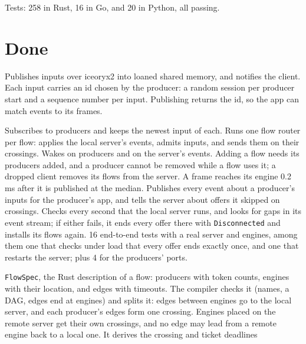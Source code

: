 \documentclass[11pt]{article}
\newcommand{\code}[1]{\texttt{#1}}
\begin{document}
Tests: 258 in Rust, 16 in Go, and 20 in Python, all passing.

\section{Done}

\begin{description}[style=nextline, leftmargin=1.5em]
  \item[Producer (\code{producer.rs}, \code{envelope.rs})] Publishes inputs
        over iceoryx2 into loaned shared memory, and notifies the client. Each
        input carries an id chosen by the producer: a random session per
        producer start and a sequence number per input. Publishing returns
        the id, so the app can match events to its frames.
  \item[Client thread (\code{client.rs}, \code{client/worker.rs},
        \code{client/producers.rs})] Subscribes to producers and keeps the
        newest input of each. Runs one flow router per flow: applies the local
        server's events, admits inputs, and sends them on their crossings.
        Wakes on producers and on the server's events. Adding a flow needs its
        producers added, and a producer cannot be removed while a flow uses
        it; a dropped client removes its flows from the server. A frame
        reaches its engine 0.2\,ms after it is published at the median.
        Publishes every event about a producer's inputs for the producer's
        app, and tells the server about offers it skipped on crossings. Checks
        every second that the local server runs, and looks for gaps in its
        event stream; if either fails, it ends every offer there with
        \code{Disconnected} and installs its flows again. 16 end-to-end tests
        with a real server and engines, among them one that checks under load
        that every offer ends exactly once, and one that restarts the server;
        plus 4 for the producers' ports.
  \item[Flow spec and compiler (\code{spec.rs}, \code{client/compile.rs})]
        \code{FlowSpec}, the Rust description of a flow: producers with token
        counts, engines with their location, and edges with timeouts. The
        compiler checks it (names, a DAG, edges end at engines) and splits it:
        edges between engines go to the local server, and each producer's
        edges form one crossing. Engines placed on the remote server
        get their own crossings, and no edge may lead from a remote engine
        back to a local one. It derives the crossing and ticket deadlines

\end{description}
\end{document}
